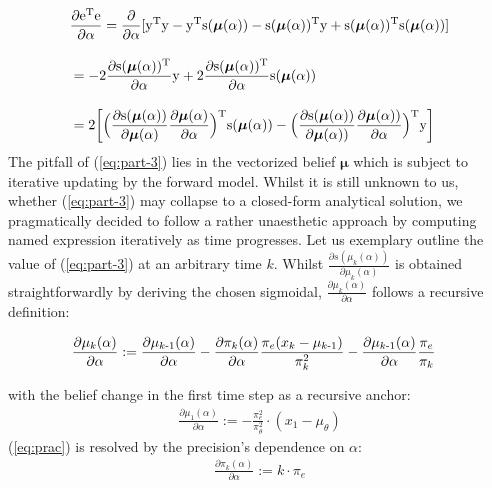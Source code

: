 \documentclass{article}
\begin{document}
\begin{multicols}{2}
{\small
\begin{align}
&\rm \frac{\partial \boldsymbol{e}^T \boldsymbol{e}}{\partial \alpha} = \frac{\partial}{\partial \alpha} [\boldsymbol{y}^T\boldsymbol{y} - \boldsymbol{y}^T s(\boldsymbol{\mu}(\alpha)) - s(\boldsymbol{\mu}(\alpha))^T\boldsymbol{y} + s(\boldsymbol{\mu}(\alpha))^T s(\boldsymbol{\mu}(\alpha))] \label{eq:part-1}  \\[1em] 
&\rm = -2 \frac{\partial s(\boldsymbol{\mu}(\alpha))^T}{\partial \alpha} \boldsymbol{y} + 2 \frac{\partial s(\boldsymbol{\mu}(\alpha))^T}{\partial \alpha} s(\boldsymbol{\mu}(\alpha)) \label{eq:part-2}  \\[1em] 
&\rm = 2 \bigg[ \Big(\frac{\partial s(\boldsymbol{\mu}(\alpha))}{\partial \boldsymbol{\mu}(\alpha)} \frac{\partial \boldsymbol{\mu}(\alpha)}{\partial \alpha}\Big)^T s(\boldsymbol{\mu}(\alpha)) - \Big(\frac{\partial s(\boldsymbol{\mu}(\alpha))}{\partial \boldsymbol{\mu}(\alpha))} \frac{\partial \boldsymbol{\mu}(\alpha))}{\partial \alpha}\Big)^T \boldsymbol{y} \bigg] \label{eq:part-3} 
\end{align}
}%
The pitfall of (\ref{eq:part-3}) lies in the vectorized belief $\boldsymbol{\mu}$ which is subject to iterative updating by the forward model. Whilst it is still unknown to us, whether (\ref{eq:part-3}) may collapse to a closed-form analytical solution, we pragmatically decided to follow a rather unaesthetic approach by computing named expression iteratively as time progresses.  
Let us exemplary outline the value of (\ref{eq:part-3}) at an arbitrary time $k$. Whilst $\frac{\partial s({\mu_k}(\alpha))}{\partial {\mu_k}(\alpha)}$ is obtained straightforwardly by deriving the chosen sigmoidal, $\frac{\partial \mu_k(\alpha)}{\partial \alpha}$ follows a recursive definition:

{\small
\begin{align}
\hspace{-3mm}
\frac{\partial \mu_k(\alpha)}{\partial \alpha} := \frac{\partial \mu_{k\text{-}1}(\alpha)}{\partial \alpha} - \frac{\partial \pi_k(\alpha)}{\partial \alpha} \frac{\pi_e(x_k-\mu_{k\text{-}1})}{\pi_k^2} - \frac{\partial \mu_{k\text{-}1}(\alpha)}{\partial \alpha} \frac{\pi_e}{\pi_k} \label{eq:prac}
\end{align}
}%

with the belief change in the first time step as a recursive anchor:
\begin{align}
\frac{\partial \mu_1(\alpha)}{\partial \alpha} := - \frac{\pi_e^2}{\pi_{\theta}^2} \cdot (x_1-\mu_{\theta}) \label{eq:anc-mu}
\end{align}
(\ref{eq:prac}) is resolved by the precision's dependence on $\alpha$: 
\begin{align}
\frac{\partial \pi_k(\alpha)}{\partial \alpha} := k\cdot \pi_e \label{eq:anc-pi}
\end{align}


\end{multicols}
\end{document}
